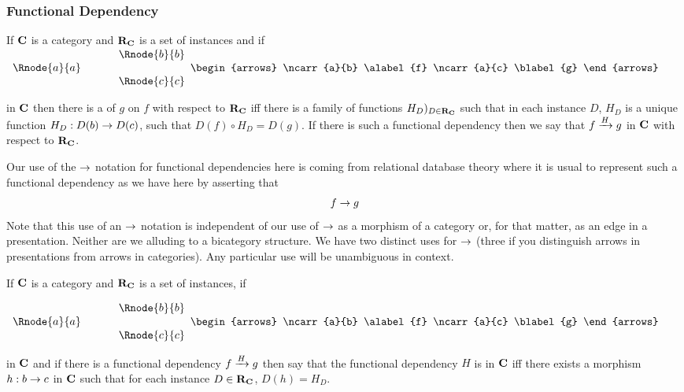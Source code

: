 \subsubsection{Functional Dependency}
\newcommand {\fgsourcediag}{
$
\begin{array}{c p{0.5cm} c  }
             &&   \Rnode{b}{b} \\[0.01cm]
\Rnode{a}{a} &&                \\[0.01cm] 
             &&   \Rnode{c}{c}         
\end{array} 
\begin{arrows}
\ncarr{a}{b}
\alabel{f}
\ncarr{a}{c}
\blabel{g}
\end{arrows}
$  
}
\begin{definition}
If $\catc$ is a category and $\reqtc$ is a set of instances and if \fgsourcediag
in $\catc$ then there is a   of $g$ on $f$ with respect to $\reqtc$ iff
there is a family of functions $H_D)_{D \in \reqtc}$ such that 
in each instance $D$, $H_D$ is a unique function $H_D: D(b) \morph D(c)$, such that $D(f) \circ H_D = D(g)$. 
If there is such a functional dependency then we say that $\fundep{H}{f}{g}$ in $\catc$ with respect to $\reqtc$.
\end{definition}

Our use of the $\morph$ notation for functional dependencies here is coming from relational database theory where it is usual to represent such a functional dependency as we have here by asserting that 
$$
f \morph g
$$
Note that this use of an $\morph$ notation is independent of our use of $\morph$ as a morphism of a category 
or, for that matter, as an edge in a presentation. Neither are we alluding to a bicategory structure. We have two distinct uses for $\morph$ (three if you distinguish arrows in presentations from arrows in categories). Any particular use will be unambiguous in context.

\begin{definition}
If $\catc$ is a category and $\reqtc$ is a set of instances, if
\fgsourcediag
in $\catc$ 
and if there is a functional dependency $\fundep{H}{f}{g}$ then say that 
the functional dependency $H$ is  in $\catc$ 
iff there exists a morphism $h:b \morph c$ in $\catc$ such that for each instance $D \in \reqtc$, $D(h)=H_D$.
\end{definition}


